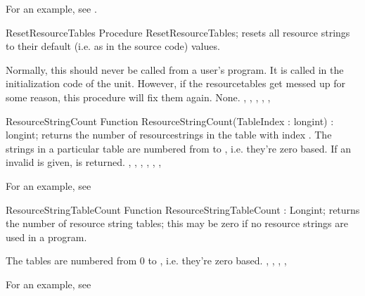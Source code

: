 For an example, see .

\begin{procedure}{ResetResourceTables}
\Declaration
Procedure ResetResourceTables;
\Description
{} resets all resource strings to their default
(i.e. as in the source code) values.

Normally, this should never be called from a user's program. It is called
in the initialization code of the  unit. However, if the
resourcetables get messed up for some reason, this procedure will fix them
again.
\Errors
None.
\SeeAlso
{},
,
,
,
,
\end{procedure}

\begin{function}{ResourceStringCount}
\Declaration
Function ResourceStringCount(TableIndex : longint) : longint;
\Description
{} returns the number of resourcestrings in
the table with index . The strings in a particular table
are numbered from  to , i.e. they're zero
based.
\Errors
If an invalid  is given,  is returned.
\SeeAlso
{},
,
,
,
,
,
\end{function}

For an example, see 

\begin{function}{ResourceStringTableCount}
\Declaration
Function ResourceStringTableCount : Longint;
\Description
{} returns the number of resource string tables;
this may be zero if no resource strings are used in a program.

The tables are numbered from 0 to , i.e.
they're zero based.
\Errors
\SeeAlso
{},
,
,
,
\end{function}

For an example, see 

